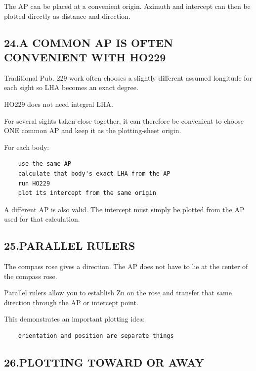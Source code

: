 \documentclass[11pt]{article}
\begin{document}
The AP can be placed at a convenient origin. Azimuth and intercept can then be plotted directly as distance and direction.

\subsection*{24.\quad A COMMON AP IS OFTEN CONVENIENT WITH HO229}

Traditional Pub. 229 work often chooses a slightly different assumed longitude for each sight so LHA becomes an exact degree.

HO229 does not need integral LHA.

For several sights taken close together, it can therefore be convenient to choose ONE common AP and keep it as the plotting-sheet origin.

For each body:

\begin{verbatim}
    use the same AP
    calculate that body's exact LHA from the AP
    run HO229
    plot its intercept from the same origin
\end{verbatim}

A different AP is also valid. The intercept must simply be plotted from the AP used for that calculation.

\subsection*{25.\quad PARALLEL RULERS}

The compass rose gives a direction. The AP does not have to lie at the center of the compass rose.

Parallel rulers allow you to establish Zn on the rose and transfer that same direction through the AP or intercept point.

This demonstrates an important plotting idea:

\begin{verbatim}
    orientation and position are separate things
\end{verbatim}

\subsection*{26.\quad PLOTTING TOWARD OR AWAY}
\end{document}
